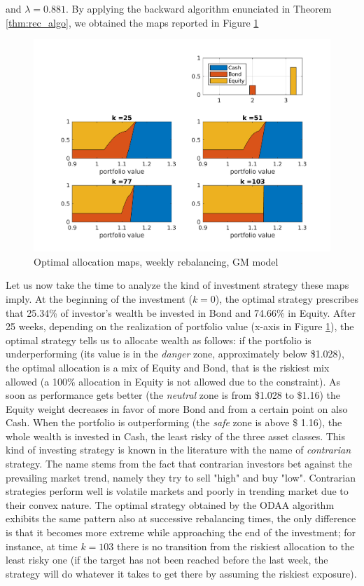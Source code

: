 and $\lambda = 0.881$.
By applying the backward algorithm enunciated in Theorem \ref{thm:rec_algo}, we obtained the maps reported in Figure \ref{fig:mapsMixture}
\begin{figure}[h]\label{fig:mapsMixture}
	\includegraphics[scale = 0.9]{Images/mapsMixturewk.png}
	\caption{Optimal allocation maps, weekly rebalancing, GM model}
\end{figure}


Let us now take the time to analyze the kind of investment strategy these maps imply. At the beginning of the investment ($k=0$), the optimal strategy prescribes that 25.34\% of investor's wealth be invested in Bond and 74.66\% in Equity. After 25 weeks, depending on the realization of portfolio value (x-axis in Figure \ref{fig:mapsMixture}), the optimal strategy tells us to allocate wealth as follows: if the portfolio is underperforming (its value is in the \textit{danger} zone, approximately below \$1.028), the optimal allocation is a mix of Equity and Bond, that is the riskiest mix allowed (a 100\% allocation in Equity is not allowed due to the  constraint). As soon as performance gets better (the \textit{neutral} zone is from \$1.028 to \$1.16) the Equity weight decreases in favor of more Bond and from a certain point on also Cash. When the portfolio is outperforming (the \textit{safe} zone is above \$ 1.16), the whole wealth is invested in Cash, the least risky of the three asset classes. This kind of investing strategy is known in the literature with the name of \textit{contrarian} strategy. The name stems from the fact that contrarian investors bet against the prevailing market trend, namely they try to sell "high" and buy "low". Contrarian strategies perform well is volatile markets and poorly in trending market due to their convex nature. The optimal strategy obtained by the ODAA algorithm exhibits the same pattern also at successive rebalancing times, the only difference is that it becomes more extreme while approaching the end of the investment; for instance, at time $k=103$ there is no transition from the riskiest allocation to the least risky one (if the target has not been reached before the last week, the strategy will do whatever it takes to get there by assuming the riskiest exposure).

